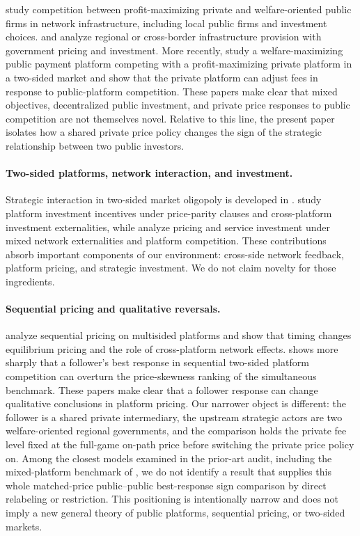 \citet{ZogheibBourreau2021} study competition between profit-maximizing private and welfare-oriented public firms in network infrastructure, including local public firms and investment choices. \citet{Mun2019} and \citet{MunNakagawa2010} analyze regional or cross-border infrastructure provision with government pricing and investment. More recently, \citet{LiuReshidiRivadeneyra2026} study a welfare-maximizing public payment platform competing with a profit-maximizing private platform in a two-sided market and show that the private platform can adjust fees in response to public-platform competition. These papers make clear that mixed objectives, decentralized public investment, and private price responses to public competition are not themselves novel. Relative to this line, the present paper isolates how a shared private price policy changes the sign of the strategic relationship between two public investors.

\paragraph{Two-sided platforms, network interaction, and investment.}
Strategic interaction in two-sided market oligopoly is developed in \citet{FarhiHagiu2008}. \citet{HahnKim2026} study platform investment incentives under price-parity clauses and cross-platform investment externalities, while \citet{HeEtAl2026} analyze pricing and service investment under mixed network externalities and platform competition. These contributions absorb important components of our environment: cross-side network feedback, platform pricing, and strategic investment. We do not claim novelty for those ingredients.

\paragraph{Sequential pricing and qualitative reversals.}
\citet{BontemsHamiltonLepore2025} analyze sequential pricing on multisided platforms and show that timing changes equilibrium pricing and the role of cross-platform network effects. \citet{SanchezCartas2026} shows more sharply that a follower's best response in sequential two-sided platform competition can overturn the price-skewness ranking of the simultaneous benchmark. These papers make clear that a follower response can change qualitative conclusions in platform pricing. Our narrower object is different: the follower is a shared private intermediary, the upstream strategic actors are two welfare-oriented regional governments, and the comparison holds the private fee level fixed at the full-game on-path price before switching the private price policy on. Among the closest models examined in the prior-art audit, including the mixed-platform benchmark of \citet{Kim2024MixedDuopoly}, we do not identify a result that supplies this whole matched-price public--public best-response sign comparison by direct relabeling or restriction. This positioning is intentionally narrow and does not imply a new general theory of public platforms, sequential pricing, or two-sided markets.
